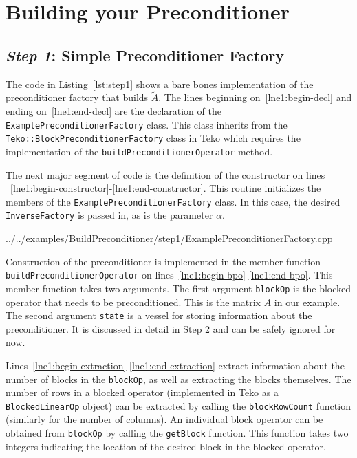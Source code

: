 \documentclass[12pt]{article}
\newcommand{\code}[1]{\lstinline[basicstyle=\footnotesize]!#1!}
\begin{document}
\section{Building your Preconditioner}\label{sec:build-prec}

\subsection{\emph{Step 1}: Simple Preconditioner Factory}
The code in Listing~\ref{lst:step1} shows a bare bones implementation of the
preconditioner factory that builds $\tilde{A}$. The lines beginning on~\ref{lne1:begin-decl}
and ending on~\ref{lne1:end-decl} are the declaration of the 
\code{ExamplePreconditionerFactory} class. This class inherits
from the \code{Teko::BlockPreconditionerFactory} class in Teko which requires
the implementation of the \code{buildPreconditionerOperator} method. 

The next major segment of code is the definition of the constructor on lines
~\ref{lne1:begin-constructor}-\ref{lne1:end-constructor}. This routine initializes
the members of the \code{ExamplePreconditionerFactory} class. In this case,
the desired \code{InverseFactory} is passed in, as is the parameter $\alpha$.

\begin{framed}

   {../../examples/BuildPreconditioner/step1/ExamplePreconditionerFactory.cpp}
\end{framed}

Construction of the preconditioner is implemented in the member
function \code{buildPreconditionerOperator} on lines~\ref{lne1:begin-bpo}-\ref{lne1:end-bpo}.
This member function takes two arguments. The first argument \code{blockOp} is the blocked operator
that needs to be preconditioned. This is the matrix $A$ in our example. The second argument
\code{state} is a vessel for storing information about the preconditioner. It is discussed 
in detail in Step 2 and can be safely ignored for now.

Lines~\ref{lne1:begin-extraction}-\ref{lne1:end-extraction} extract information about the number
of blocks in the \code{blockOp}, as well as extracting the blocks themselves. The number of rows
in a blocked operator (implemented in Teko as a \code{BlockedLinearOp} object) can be extracted by
calling the \code{blockRowCount} function (similarly for the number of columns). An individual block operator
can be obtained from \code{blockOp} by calling the \code{getBlock} function. This function takes
two integers indicating the location of the desired block in the blocked operator.
\end{document}
